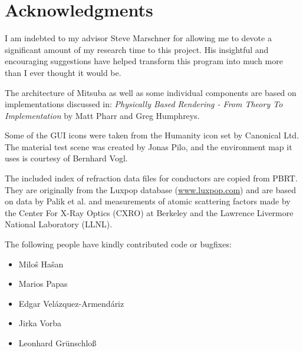 \section{Acknowledgments}
I am indebted to my advisor Steve Marschner for allowing me to devote
a significant amount of my research time to this project. His insightful and
encouraging suggestions have helped transform this program into much more than
I ever thought it would be.

The architecture of Mitsuba as well as some individual components are based on
implementations discussed in: \emph{Physically Based Rendering - From Theory
To Implementation} by Matt Pharr and Greg Humphreys.

Some of the GUI icons were taken from the Humanity icon set by Canonical Ltd.
The material test scene was created by Jonas Pilo, and the environment map
it uses is courtesy of Bernhard Vogl.

The included index of refraction data files for conductors are copied from
PBRT. They are originally from the Luxpop database (\url{www.luxpop.com})
and are based on data by Palik et al. \cite{Palik1998Handbook}
and measurements of atomic scattering factors made by the Center For
X-Ray Optics (CXRO) at Berkeley and the Lawrence Livermore National
Laboratory (LLNL).

The following people have kindly contributed code or bugfixes:
\begin{itemize}
\item Milo\^{s} Ha\^{s}an
\item Marios Papas
\item Edgar Vel\'{a}zquez-Armend\'{a}riz
\item Jirka Vorba
\item Leonhard Gr\"unschlo\ss
\end{itemize}

